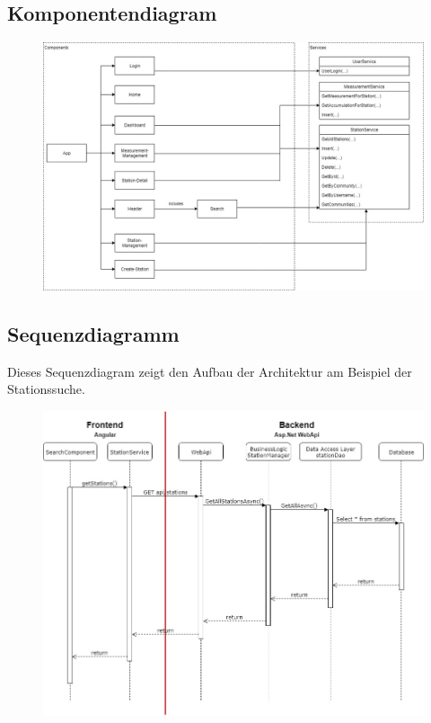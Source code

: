 \documentclass[10pt,a4paper,margin=0pt]{scrartcl}
\begin{document}
\subsection{Komponentendiagram}
\begin{figure}[H]
	\includegraphics[width=\textwidth]{./architecture/components.jpg}
	\centering
\end{figure}
\pagebreak
\subsection{Sequenzdiagramm}
Dieses Sequenzdiagram zeigt den Aufbau der Architektur am Beispiel der Stationssuche.
\begin{figure}[H]
	\includegraphics[width=\textwidth]{./architecture/sequence.jpg}
	\centering
\end{figure}
\pagebreak
\end{document}
